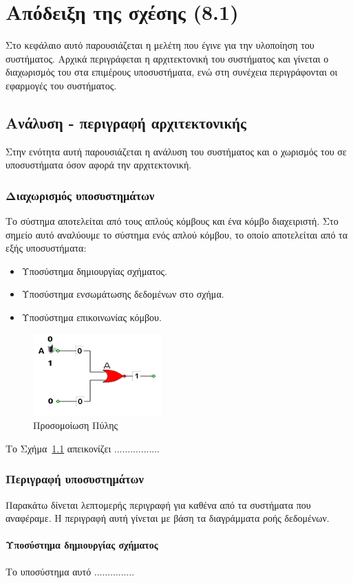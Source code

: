 \chapter{Απόδειξη της σχέσης (8.1)}
Στο κεφάλαιο αυτό παρουσιάζεται η μελέτη που έγινε για την
υλοποίηση του συστήματος. Αρχικά περιγράφεται η αρχιτεκτονική του
συστήματος και γίνεται ο διαχωρισμός του στα επιμέρους
υποσυστήματα, ενώ στη συνέχεια περιγράφονται οι εφαρμογές του
συστήματος.

\section{Ανάλυση - περιγραφή αρχιτεκτονικής}
Στην ενότητα αυτή παρουσιάζεται η ανάλυση του συστήματος και ο
χωρισμός του σε υποσυστήματα όσον αφορά την αρχιτεκτονική.

\subsection{Διαχωρισμός υποσυστημάτων}
Το σύστημα αποτελείται από τους απλούς κόμβους και ένα κόμβο
διαχειριστή. Στο σημείο αυτό αναλύουμε το σύστημα ενός απλού
κόμβου, το οποίο αποτελείται από τα εξής υποσυστήματα:

\begin{itemize}
\item Υποσύστημα δημιουργίας σχήματος.
\item Υποσύστημα ενσωμάτωσης δεδομένων στο σχήμα.
\item Υποσύστημα επικοινωνίας κόμβου.
\end{itemize}


\begin{figure}[!ht] \centering
\includegraphics{static/figures/2.png} \caption{Προσομοίωση Πύλης }\label{figureB.1}
\end{figure}

Το Σχήμα~\ref{figureB.1} απεικονίζει .................


\subsection{Περιγραφή υποσυστημάτων}
Παρακάτω δίνεται λεπτομερής περιγραφή για καθένα από τα συστήματα
που αναφέραμε. Η περιγραφή αυτή γίνεται με βάση τα διαγράμματα
ροής δεδομένων.

\subsubsection{Υποσύστημα δημιουργίας σχήματος}
Το υποσύστημα αυτό ...............